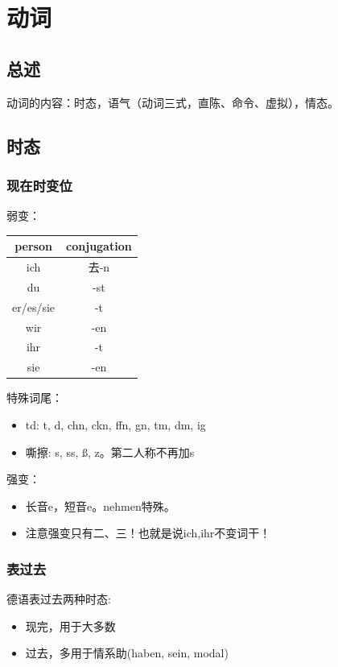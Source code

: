 \chapter{动词}
\section{总述}
动词的内容：时态，语气（动词三式，直陈、命令、虚拟），情态。
\section{时态}
\subsection{现在时变位}
弱变：
\begin{center}
    \begin{tabular}{|c|c|}
        \hline
        \rowcolor{gray}
        person    & conjugation \\
        \hline
        ich       & 去-n         \\
        du        & -st         \\
        er/es/sie & -t          \\
        wir       & -en         \\
        ihr       & -t          \\
        sie       & -en         \\
        \hline
    \end{tabular}
\end{center}

特殊词尾：
\begin{itemize}
    \label{chap:verb:td}
    \item td: t, d, chn, ckn, ffn, gn, tm, dm, ig
          \label{chap:verb:sz}
    \item 嘶擦: s, ss, ß, z。第二人称不再加s
\end{itemize}

强变：
\begin{itemize}
    \item 长音e，短音e。nehmen特殊。
    \item 注意强变只有二、三！也就是说ich,ihr不变词干！
\end{itemize}


\subsection{表过去}
德语表过去两种时态:
\begin{itemize}
    \item 现完，用于大多数 \cir[color=gray]
    \item 过去，多用于情系助(haben, sein, modal) \flower[color=gray]
\end{itemize}

